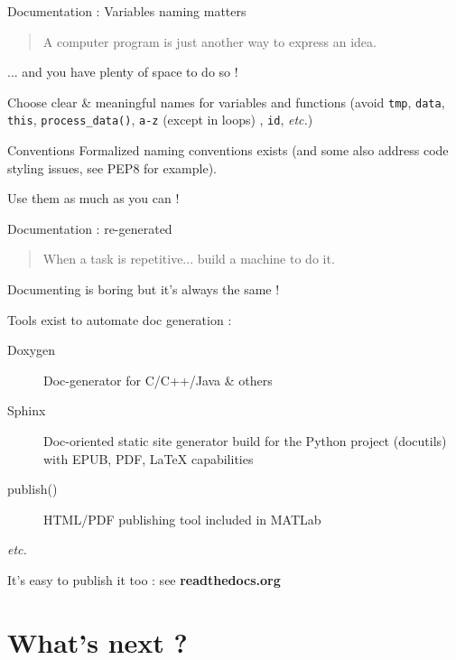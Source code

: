 \documentclass[10pt]{beamer}
\begin{document}
\begin{frame}{Documentation : Variables naming matters} %

	\begin{quotation}
		\noindent A computer program is just another way to express an idea.
	\end{quotation}

	... and you have plenty of space to do so !

	\pause
	\medskip

	Choose clear \& meaningful names for variables and functions  (avoid \texttt{tmp}, \texttt{data}, \texttt{this},
	\texttt{process\_data()}, \texttt{a-z} (except in loops) , \texttt{id}, \textit{etc.})

	\pause
	\medskip

	\begin{block}{Conventions}
		Formalized naming conventions exists (and some also address code styling issues, see
		PEP8 for example).

		Use them as much as you can !
	\end{block}

\end{frame}

\begin{frame}{Documentation : re-generated}

	\begin{quotation}
		When a task is repetitive... build a machine to do it.
	\end{quotation}

	Documenting is boring but it's always the same !

	Tools exist to automate doc generation :

	\begin{description}
		\item[Doxygen] Doc-generator for C/C++/Java \& others
		\item[Sphinx] Doc-oriented static site generator build for the Python project (docutils) with EPUB, PDF, \LaTeX{} capabilities
		\item[publish()] HTML/PDF publishing tool included in MATLab
		\item[\textit{etc.}]
	\end{description}

	It's easy to publish it too : see \textbf{readthedocs.org}
\end{frame}

\section{What's next ?} %
\end{document}
